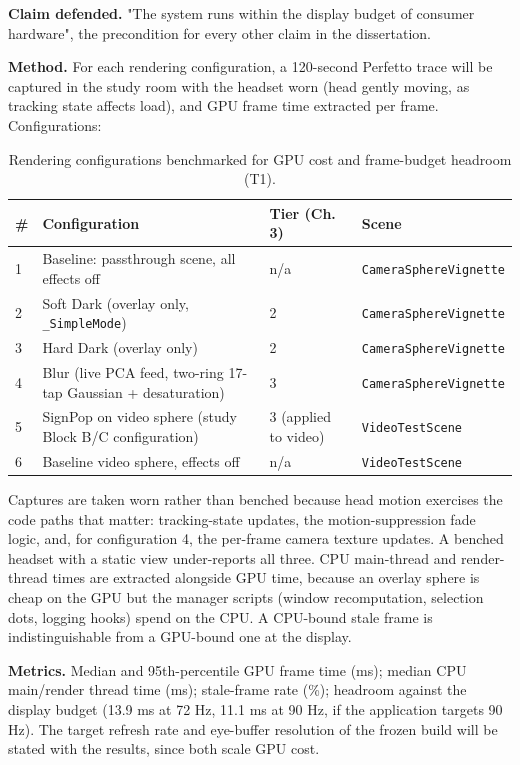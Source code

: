 \textbf{Claim defended.} "The system runs within the display budget of consumer hardware", the
precondition for every other claim in the dissertation.

\textbf{Method.} For each rendering configuration, a 120-second Perfetto trace will be captured in the
study room with the headset worn (head gently moving, as tracking state affects load), and GPU
frame time extracted per frame. Configurations:

\begin{longtable}{p{}|p{}|p{}|p{}}
\caption{Rendering configurations benchmarked for GPU cost and frame-budget headroom (T1).}\\
\hline
\textbf{\#} & \textbf{Configuration} & \textbf{Tier (Ch. 3)} & \textbf{Scene} \\
\hline
\endhead
\hline
1 & Baseline: passthrough scene, all effects off & n/a & \verb|CameraSphereVignette| \\
2 & Soft Dark (overlay only, \verb|_SimpleMode|) & 2 & \verb|CameraSphereVignette| \\
3 & Hard Dark (overlay only) & 2 & \verb|CameraSphereVignette| \\
4 & Blur (live PCA feed, two-ring 17-tap Gaussian + desaturation) & 3 & \verb|CameraSphereVignette| \\
5 & SignPop on video sphere (study Block B/C configuration) & 3 (applied to video) & \verb|VideoTestScene| \\
6 & Baseline video sphere, effects off & n/a & \verb|VideoTestScene| \\
\hline
\end{longtable}

Captures are taken worn rather than benched because head motion exercises the code paths that
matter: tracking-state updates, the motion-suppression fade logic, and, for configuration 4, the
per-frame camera texture updates. A benched headset with a static view under-reports all three.
CPU main-thread and render-thread times are extracted alongside GPU time, because an overlay sphere
is cheap on the GPU but the manager scripts (window recomputation, selection dots, logging hooks)
spend on the CPU. A CPU-bound stale frame is indistinguishable from a GPU-bound one at the display.

\textbf{Metrics.} Median and 95th-percentile GPU frame time (ms); median CPU main/render thread time
(ms); stale-frame rate (\%); headroom against the display budget (13.9 ms at 72 Hz, 11.1 ms at
90 Hz, if the application targets 90 Hz). The target refresh rate and eye-buffer resolution of the
frozen build will be stated with the results, since both scale GPU cost.

